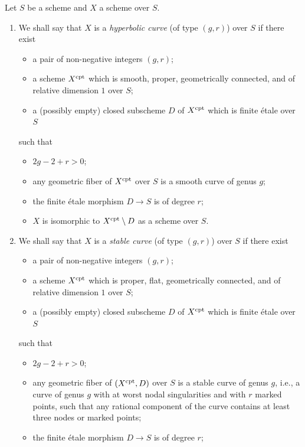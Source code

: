 \begin{defn}
  Let $S$ be a scheme and $X$ a scheme over $S$.
  \begin{enumerate}
    \item We shall say that $X$ is a \emph{hyperbolic curve} (of type $(g, r)$) over $S$ if there exist
      \begin{itemize}
        \item a pair of non-negative integers $(g, r)$;
        \item a scheme $X^{\mathrm{cpt}}$ which is smooth, proper, geometrically connected, and of relative dimension $1$ over $S$;
        \item a (possibly empty) closed subscheme $D$ of $X^{\mathrm{cpt}}$ which is finite \'{e}tale over $S$
      \end{itemize}
    such that
      \begin{itemize}
        \item $2g - 2 + r > 0$;
        \item any geometric fiber of $X^{\mathrm{cpt}}$ over $S$ is a smooth curve of genus $g$;
        \item the finite \'{e}tale morphism $D \to S$ is of degree $r$;
        \item $X$ is isomorphic to $X^{\mathrm{cpt}} \setminus D$ as a scheme over $S$.
      \end{itemize}
    \item We shall say that $X$ is a \emph{stable curve} (of type $(g, r)$) over $S$ if there exist
      \begin{itemize}
        \item a pair of non-negative integers $(g, r)$;
        \item a scheme $X^{\mathrm{cpt}}$ which is proper, flat, geometrically connected, and of relative dimension $1$ over $S$;
        \item a (possibly empty) closed subscheme $D$ of $X^{\mathrm{cpt}}$ which is finite \'{e}tale over $S$
      \end{itemize}
    such that
      \begin{itemize}
        \item $2g - 2 + r > 0$;
        \item any geometric fiber of $(X^{\mathrm{cpt}}, D)$ over $S$ is a stable curve of genus $g$, i.e., a curve of genus $g$ with at worst nodal singularities and with $r$ marked points, such that any rational component of the curve contains at least three nodes or marked points;
        \item the finite \'{e}tale morphism $D \to S$ is of degree $r$;

\end{itemize}
\end{enumerate}
\end{defn}
